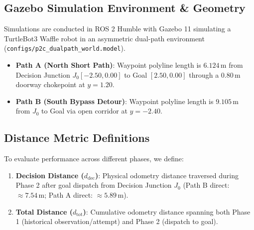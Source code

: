 \subsection{Gazebo Simulation Environment \& Geometry}
Simulations are conducted in ROS 2 Humble with Gazebo 11 simulating a TurtleBot3 Waffle robot in an asymmetric dual-path environment (\texttt{configs/p2c\_dualpath\_world.model}).
\begin{itemize}
    \item \textbf{Path A (North Short Path)}: Waypoint polyline length is $6.124\,\text{m}$ from Decision Junction $J_0 [-2.50, 0.00]$ to Goal $[2.50, 0.00]$ through a $0.80\,\text{m}$ doorway chokepoint at $y=1.20$.
    \item \textbf{Path B (South Bypass Detour)}: Waypoint polyline length is $9.105\,\text{m}$ from $J_0$ to Goal via open corridor at $y=-2.40$.
\end{itemize}

\subsection{Distance Metric Definitions}
To evaluate performance across different phases, we define:
\begin{enumerate}
    \item \textbf{Decision Distance ($d_{\text{dec}}$)}: Physical odometry distance traversed during Phase 2 after goal dispatch from Decision Junction $J_0$ (Path B direct: $\approx 7.54\,\text{m}$; Path A direct: $\approx 5.89\,\text{m}$).
    \item \textbf{Total Distance ($d_{\text{tot}}$)}: Cumulative odometry distance spanning both Phase 1 (historical observation/attempt) and Phase 2 (dispatch to goal).
\end{enumerate}

